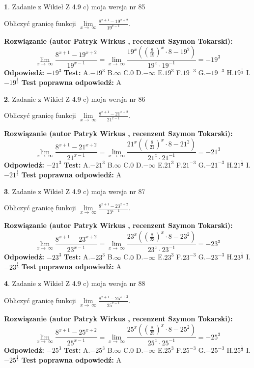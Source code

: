 \documentclass[12pt, a4paper]{article}
\theoremstyle{definition} %
\newtheorem{zad}{}
\newcommand{\zadStart}[1]{\begin{zad}#1\newline}
\newcommand{\zadStop}{\end{zad}}
\newcommand{\rozwStart}[2]{\noindent \textbf{Rozwiązanie (autor #1 , recenzent #2): }\newline}
\newcommand{\rozwStop}{\newline}
\newcommand{\odpStart}{\noindent \textbf{Odpowiedź:}\newline}
\newcommand{\odpStop}{\newline}
\newcommand{\testStart}{\noindent \textbf{Test:}\newline}
\newcommand{\testStop}{\newline}
\newcommand{\kluczStart}{\noindent \textbf{Test poprawna odpowiedź:}\newline}
\newcommand{\kluczStop}{\newline}
\begin{document}
\zadStart{Zadanie z Wikieł Z 4.9 c) moja wersja nr 85}


Obliczyć granicę funkcji  $\lim\limits_{x\to\ \infty}\frac{8^{x+1}-19^{x+2}}{19^{x-1}}$.
\zadStop
\rozwStart{Patryk Wirkus}{Szymon Tokarski}
$$\lim\limits_{x\to\ \infty}\frac{8^{x+1}-19^{x+2}}{19^{x-1}}=\lim\limits_{x\to\ \infty}\frac{19^{x}((\frac{8}{19})^{x}\cdot 8 -19^{2})}{19^{x}\cdot 19^{-1}} = -19^{3}$$
\rozwStop
\odpStart
$-19^{3}$
\odpStop
\testStart
A.$-19^{3}$ B.$\infty$ C.$0$ D.$-\infty$ E.$19^{3}$
F.$19^{-3}$ G.$-19^{-3}$
H.$19^{\frac{1}{3}}$
I.$-19^{\frac{1}{3}}$
\testStop
\kluczStart
A
\kluczStop



\zadStart{Zadanie z Wikieł Z 4.9 c) moja wersja nr 86}


Obliczyć granicę funkcji  $\lim\limits_{x\to\ \infty}\frac{8^{x+1}-21^{x+2}}{21^{x-1}}$.
\zadStop
\rozwStart{Patryk Wirkus}{Szymon Tokarski}
$$\lim\limits_{x\to\ \infty}\frac{8^{x+1}-21^{x+2}}{21^{x-1}}=\lim\limits_{x\to\ \infty}\frac{21^{x}((\frac{8}{21})^{x}\cdot 8 -21^{2})}{21^{x}\cdot 21^{-1}} = -21^{3}$$
\rozwStop
\odpStart
$-21^{3}$
\odpStop
\testStart
A.$-21^{3}$ B.$\infty$ C.$0$ D.$-\infty$ E.$21^{3}$
F.$21^{-3}$ G.$-21^{-3}$
H.$21^{\frac{1}{3}}$
I.$-21^{\frac{1}{3}}$
\testStop
\kluczStart
A
\kluczStop



\zadStart{Zadanie z Wikieł Z 4.9 c) moja wersja nr 87}


Obliczyć granicę funkcji  $\lim\limits_{x\to\ \infty}\frac{8^{x+1}-23^{x+2}}{23^{x-1}}$.
\zadStop
\rozwStart{Patryk Wirkus}{Szymon Tokarski}
$$\lim\limits_{x\to\ \infty}\frac{8^{x+1}-23^{x+2}}{23^{x-1}}=\lim\limits_{x\to\ \infty}\frac{23^{x}((\frac{8}{23})^{x}\cdot 8 -23^{2})}{23^{x}\cdot 23^{-1}} = -23^{3}$$
\rozwStop
\odpStart
$-23^{3}$
\odpStop
\testStart
A.$-23^{3}$ B.$\infty$ C.$0$ D.$-\infty$ E.$23^{3}$
F.$23^{-3}$ G.$-23^{-3}$
H.$23^{\frac{1}{3}}$
I.$-23^{\frac{1}{3}}$
\testStop
\kluczStart
A
\kluczStop



\zadStart{Zadanie z Wikieł Z 4.9 c) moja wersja nr 88}


Obliczyć granicę funkcji  $\lim\limits_{x\to\ \infty}\frac{8^{x+1}-25^{x+2}}{25^{x-1}}$.
\zadStop
\rozwStart{Patryk Wirkus}{Szymon Tokarski}
$$\lim\limits_{x\to\ \infty}\frac{8^{x+1}-25^{x+2}}{25^{x-1}}=\lim\limits_{x\to\ \infty}\frac{25^{x}((\frac{8}{25})^{x}\cdot 8 -25^{2})}{25^{x}\cdot 25^{-1}} = -25^{3}$$
\rozwStop
\odpStart
$-25^{3}$
\odpStop
\testStart
A.$-25^{3}$ B.$\infty$ C.$0$ D.$-\infty$ E.$25^{3}$
F.$25^{-3}$ G.$-25^{-3}$
H.$25^{\frac{1}{3}}$
I.$-25^{\frac{1}{3}}$
\testStop
\kluczStart
A
\kluczStop
\end{document}
